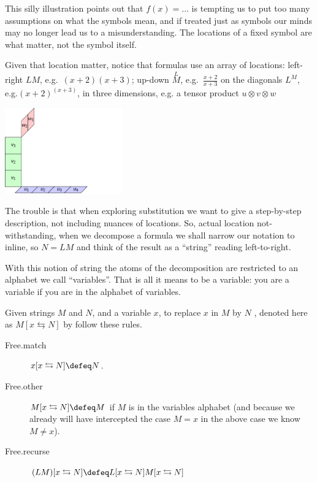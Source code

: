 This silly illustration points out that $f(x)=...$ 
is tempting us to put too many assumptions on what the symbols mean, and if treated 
just as symbols our minds may no longer lead us to a misunderstanding.  The locations
of a fixed symbol are what matter, not the symbol itself.

Given that location matter, notice that formulas use an array of locations:
left-right $LM$, e.g.\ $(x+2)(x+3)$; up-down $\overset{L}{M}$, e.g.\ $\frac{x+2}{x+3}$
on the diagonals $L^M$, e.g.$(x+2)^{(x+3)}$, in three dimensions, e.g. a tensor product $u\otimes v\otimes w$
    \begin{center}
        \includegraphics[width=2in,page=26]{Tensor-Product-Def-3D.pdf}
    \end{center}
The trouble is that when exploring substitution we want to give a step-by-step 
description, not including nuances of locations.  So, actual location not-withstanding,
when we decompose a formula we shall narrow 
our notation to inline, so $N=LM$ and think of the result as a ``string'' reading 
left-to-right.

With this notion of string the atoms of the decomposition are restricted to an
alphabet we call ``variables''. That is all it means to be a variable: you are a
variable if you are in the alphabet of variables.  

\begin{definition}
    Given strings $M$ and $N$, and a variable $x$, to replace $x$ in $M$ by $N$ ,
    denoted here as $M[x\leftrightarrows N]$ by follow these rules.
    \begin{description}
        \item[Free.match] $x[x\leftrightarrows N]\defeq N$.
        \item[Free.other] $M[x\leftrightarrows N]\defeq M$ if $M$ is in the variables alphabet (and 
        because we already will have intercepted the case $M=x$ in the above case we know $M\neq x$).
        
        \item[Free.recurse] $(LM)[x\leftrightarrows N]\defeq L[x\leftrightarrows N]M[x\leftrightarrows N]$
    \end{description}
\end{definition}

